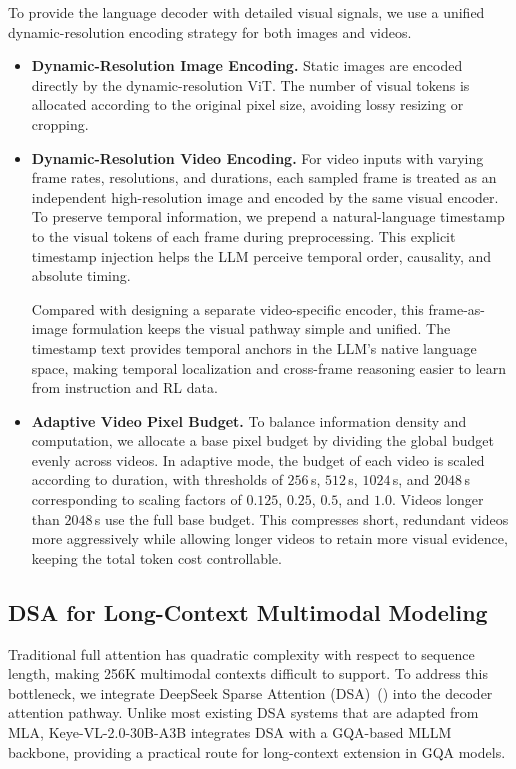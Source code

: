 \documentclass{llmxive}
\begin{document}
To provide the language decoder with detailed visual signals, we use a unified dynamic-resolution encoding strategy for both images and videos.

\begin{itemize}
    \item \textbf{Dynamic-Resolution Image Encoding.}
    Static images are encoded directly by the dynamic-resolution ViT. The number of visual tokens is allocated according to the original pixel size, avoiding lossy resizing or cropping.

    \item \textbf{Dynamic-Resolution Video Encoding.}
    For video inputs with varying frame rates, resolutions, and durations, each sampled frame is treated as an independent high-resolution image and encoded by the same visual encoder. To preserve temporal information, we prepend a natural-language timestamp to the visual tokens of each frame during preprocessing. This explicit timestamp injection helps the LLM perceive temporal order, causality, and absolute timing.

    Compared with designing a separate video-specific encoder, this frame-as-image formulation keeps the visual pathway simple and unified. The timestamp text provides temporal anchors in the LLM's native language space, making temporal localization and cross-frame reasoning easier to learn from instruction and RL data.

    \item \textbf{Adaptive Video Pixel Budget.}
    To balance information density and computation, we allocate a base pixel budget by dividing the global budget evenly across videos. In adaptive mode, the budget of each video is scaled according to duration, with thresholds of $256$\,s, $512$\,s, $1024$\,s, and $2048$\,s corresponding to scaling factors of $0.125$, $0.25$, $0.5$, and $1.0$. Videos longer than $2048$\,s use the full base budget. This compresses short, redundant videos more aggressively while allowing longer videos to retain more visual evidence, keeping the total token cost controllable.
\end{itemize}

\subsection{DSA for Long-Context Multimodal Modeling}

Traditional full attention has quadratic complexity with respect to sequence length, making 256K multimodal contexts difficult to support. To address this bottleneck, we integrate DeepSeek Sparse Attention (DSA)~(\cite{deepseek2025v32}) into the decoder attention pathway. Unlike most existing DSA systems that are adapted from MLA, Keye-VL-2.0-30B-A3B integrates DSA with a GQA-based MLLM backbone, providing a practical route for long-context extension in GQA models.
\end{document}
